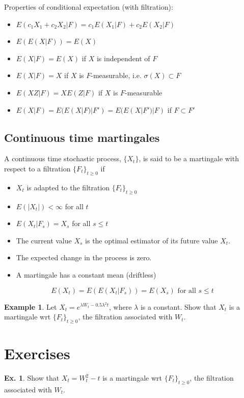 \documentclass[11pt,a4paper]{book}
\theoremstyle{definition}\newtheorem{definition}{Definition}
\theoremstyle{definition}\newtheorem{fact}{Fact}
\theoremstyle{definition}\newtheorem{remark}{Remark}
\theoremstyle{definition}\newtheorem{ex}{Ex.}
\theoremstyle{definition}\newtheorem{project}{Project}
\theoremstyle{definition}\newtheorem{problem}{Problem}
\theoremstyle{definition}\newtheorem{example}{Example}
\numberwithin{theorem}{section}
\numberwithin{corollary}{chapter}
\numberwithin{assumption}{chapter}
\numberwithin{definition}{chapter}
\numberwithin{prop}{chapter}
\numberwithin{notation}{chapter}
\numberwithin{problem}{chapter}
\numberwithin{example}{chapter}
\numberwithin{fact}{chapter}
\numberwithin{ex}{chapter}
\begin{document}
Properties of conditional expectation (with filtration):
\begin{itemize}
\item $E(c_1X_1 + c_2X_2 | F) = c_1 E(X_1 | F) + c_2 E(X_2 | F)$
\item $E( E(X|F) ) = E(X)$
\item $E(X|F) = E(X)$ if $X$ is independent of $F$
\item $E(X|F) = X$ if $X$ is $F$-measurable, i.e. $\sigma(X) \subset F$
\item $E(XZ|F) = XE(Z|F)$ if $X$ is $F$-measurable
\item $E(X|F) = E(E(X|F)|F') = E(E(X|F')|F)$ if $F \subset F'$
\end{itemize}

\subsection{Continuous time martingales}
A continuous time stochastic process, $\{X_t\}$, is said to be a martingale with respect to a filtration $\{F_t\}_{t\geq 0}$ if
\begin{itemize}
\item $X_t$ is adapted to the filtration $\{F_t\}_{t\geq 0}$
\item $E(|X_t|) < \infty$ for all $t$
\item $E(X_t | F_s) = X_s$ for all $s \leq t$
\end{itemize}

\begin{itemize}[label={$\Rightarrow$}]
\item The current value $X_s$ is the optimal estimator of its future value $X_t$. 
\item The expected change in the process is zero.
\item A martingale has a constant mean (driftless)
\end{itemize}
$$E(X_t) = E(E(X_t | F_s)) = E(X_s) \text{ for all } s \leq t$$
\begin{example}
Let $X_t = e^{\lambda W_t - 0.5 \lambda^2 t}$, where $\lambda$ is a constant. Show that $X_t$ is a martingale wrt $\{F_t\}_{t\geq 0}$, the filtration associated with $W_t$.
\end{example}

\section{Exercises}
\begin{ex}
Show that $X_t = W_t^2 - t$ is a martingale wrt $\{F_t\}_{t\geq 0}$, the filtration associated with $W_t$.
\end{ex}
\end{document}
